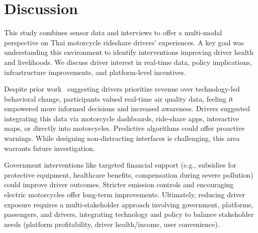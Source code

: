 \section{Discussion}

This study combines sensor data and interviews to offer a multi-modal perspective on Thai motorcycle rideshare drivers' experiences.
A key goal was understanding this environment to identify interventions improving driver health and livelihoods.
We discuss driver interest in real-time data, policy implications, infrastructure improvements, and platform-level incentives.




Despite prior work~\cite{tieanklin2024rideshare} suggesting drivers prioritize revenue over technology-led behavioral change, participants valued real-time air quality data, feeling it empowered more informed decisions and increased awareness.
Drivers suggested integrating this data via motorcycle dashboards, ride-share apps, interactive maps, or directly into motorcycles.
Predictive algorithms could offer proactive warnings.
While designing non-distracting interfaces is challenging, this area warrants future investigation.


Government interventions like targeted financial support (e.g., subsidies for protective equipment, healthcare benefits, compensation during severe pollution) could improve driver outcomes.
Stricter emission controls and encouraging electric motorcycles offer long-term improvements.
Ultimately, reducing driver exposure requires a multi-stakeholder approach involving government, platforms, passengers, and drivers, integrating technology and policy to balance stakeholder needs (platform profitability, driver health/income, user convenience).

